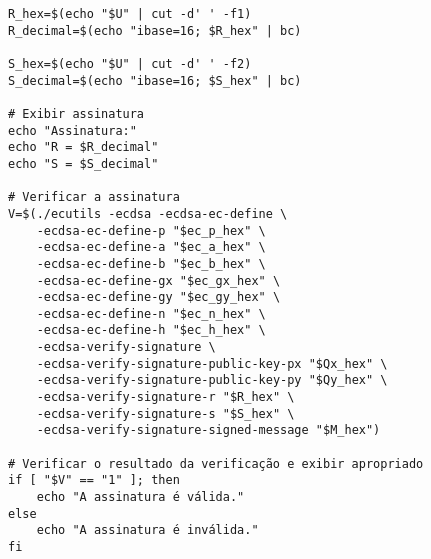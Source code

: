 \begin{verbatim}
R_hex=$(echo "$U" | cut -d' ' -f1)
R_decimal=$(echo "ibase=16; $R_hex" | bc)

S_hex=$(echo "$U" | cut -d' ' -f2)
S_decimal=$(echo "ibase=16; $S_hex" | bc)

# Exibir assinatura
echo "Assinatura:"
echo "R = $R_decimal"
echo "S = $S_decimal"

# Verificar a assinatura
V=$(./ecutils -ecdsa -ecdsa-ec-define \
    -ecdsa-ec-define-p "$ec_p_hex" \
    -ecdsa-ec-define-a "$ec_a_hex" \
    -ecdsa-ec-define-b "$ec_b_hex" \
    -ecdsa-ec-define-gx "$ec_gx_hex" \
    -ecdsa-ec-define-gy "$ec_gy_hex" \
    -ecdsa-ec-define-n "$ec_n_hex" \
    -ecdsa-ec-define-h "$ec_h_hex" \
    -ecdsa-verify-signature \
    -ecdsa-verify-signature-public-key-px "$Qx_hex" \
    -ecdsa-verify-signature-public-key-py "$Qy_hex" \
    -ecdsa-verify-signature-r "$R_hex" \
    -ecdsa-verify-signature-s "$S_hex" \
    -ecdsa-verify-signature-signed-message "$M_hex")

# Verificar o resultado da verificação e exibir apropriado
if [ "$V" == "1" ]; then
    echo "A assinatura é válida."
else
    echo "A assinatura é inválida."
fi
\end{verbatim}

